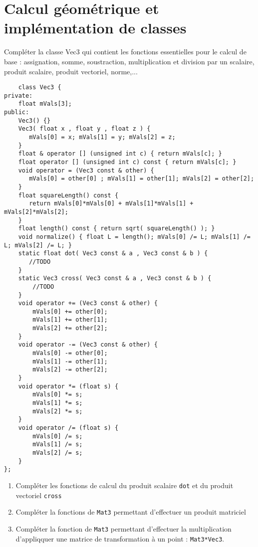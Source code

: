 \documentclass[a4paper,10pt]{article}
\newcommand\code[1]{\lstinline[columns=fixed]{#1}}
\begin{document}
\section{Calcul géométrique et implémentation de classes}

\label{sec_exo_Vec3}

Compléter la classe Vec3 qui contient les fonctions essentielles pour le calcul de base : assignation, somme, soustraction, multiplication et division par un scalaire, produit scalaire, produit vectoriel, norme,...
\lstset{language=C++}
\begin{lstlisting}
    class Vec3 {
private:
    float mVals[3];
public:
    Vec3() {}
    Vec3( float x , float y , float z ) {
       mVals[0] = x; mVals[1] = y; mVals[2] = z;
    }
    float & operator [] (unsigned int c) { return mVals[c]; }
    float operator [] (unsigned int c) const { return mVals[c]; }
    void operator = (Vec3 const & other) {
       mVals[0] = other[0] ; mVals[1] = other[1]; mVals[2] = other[2];
    }
    float squareLength() const {
       return mVals[0]*mVals[0] + mVals[1]*mVals[1] + mVals[2]*mVals[2];
    }
    float length() const { return sqrt( squareLength() ); }
    void normalize() { float L = length(); mVals[0] /= L; mVals[1] /= L; mVals[2] /= L; }
    static float dot( Vec3 const & a , Vec3 const & b ) {
       //TODO
    }
    static Vec3 cross( Vec3 const & a , Vec3 const & b ) {
        //TODO
    }
    void operator += (Vec3 const & other) {
        mVals[0] += other[0];
        mVals[1] += other[1];
        mVals[2] += other[2];
    }
    void operator -= (Vec3 const & other) {
        mVals[0] -= other[0];
        mVals[1] -= other[1];
        mVals[2] -= other[2];
    }
    void operator *= (float s) {
        mVals[0] *= s;
        mVals[1] *= s;
        mVals[2] *= s;
    }
    void operator /= (float s) {
        mVals[0] /= s;
        mVals[1] /= s;
        mVals[2] /= s;
    }
};
\end{lstlisting}

\begin{enumerate}
 \item Compléter les fonctions de calcul du produit scalaire \code{dot} et du produit vectoriel \code{cross}
\item Compléter la fonctions de \code{Mat3} permettant d'effectuer un produit matriciel
\item Compléter la fonction de \code{Mat3} permettant d'effectuer la multiplication d'appliqquer une matrice de transformation à un point : \code{Mat3*Vec3}.
\end{enumerate}
\end{document}
